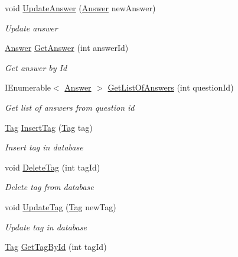 \begin{DoxyCompactItemize}
void \hyperlink{class_website_1_1_models_1_1_d_a_l_e_f_a366db29fb1594b4a21e4d884a7121d66}{Update\+Answer} (\hyperlink{class_website_1_1_models_1_1_answer}{Answer} new\+Answer)
\begin{DoxyCompactList}\small\item\em Update answer \end{DoxyCompactList}\item 
\hyperlink{class_website_1_1_models_1_1_answer}{Answer} \hyperlink{class_website_1_1_models_1_1_d_a_l_e_f_aa328ef39b44a92197e45fec3531cec1d}{Get\+Answer} (int answer\+Id)
\begin{DoxyCompactList}\small\item\em Get answer by Id \end{DoxyCompactList}\item 
I\+Enumerable$<$ \hyperlink{class_website_1_1_models_1_1_answer}{Answer} $>$ \hyperlink{class_website_1_1_models_1_1_d_a_l_e_f_a687c41c575407af52651a7148ec84e51}{Get\+List\+Of\+Answers} (int question\+Id)
\begin{DoxyCompactList}\small\item\em Get list of answers from question id \end{DoxyCompactList}\item 
\hyperlink{class_website_1_1_models_1_1_tag}{Tag} \hyperlink{class_website_1_1_models_1_1_d_a_l_e_f_ab4bf3d964dfe0e0e86a1e050c43e458c}{Insert\+Tag} (\hyperlink{class_website_1_1_models_1_1_tag}{Tag} tag)
\begin{DoxyCompactList}\small\item\em Insert tag in database \end{DoxyCompactList}\item 
void \hyperlink{class_website_1_1_models_1_1_d_a_l_e_f_aa76b5d3c9dde418b5a4a324abbea3e5f}{Delete\+Tag} (int tag\+Id)
\begin{DoxyCompactList}\small\item\em Delete tag from database \end{DoxyCompactList}\item 
void \hyperlink{class_website_1_1_models_1_1_d_a_l_e_f_ac07ba38759bbbbe9d3d67ebdd07b05f5}{Update\+Tag} (\hyperlink{class_website_1_1_models_1_1_tag}{Tag} new\+Tag)
\begin{DoxyCompactList}\small\item\em Update tag in database \end{DoxyCompactList}\item 
\hyperlink{class_website_1_1_models_1_1_tag}{Tag} \hyperlink{class_website_1_1_models_1_1_d_a_l_e_f_a1aa3fa49f4e6727e8d41775a6c16747f}{Get\+Tag\+By\+Id} (int tag\+Id)

\end{DoxyCompactItemize}
